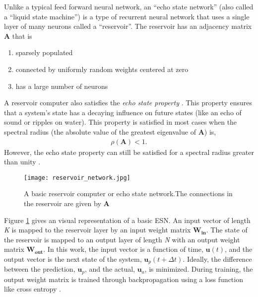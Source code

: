 Unlike a typical feed forward neural network, an ``echo state network'' (also
called a ``liquid state machine'') is a type of
recurrent neural network that uses a single layer of many neurons called a
``reservoir''. The reservoir has an adjacency matrix $\bm{A}$ that is
\begin{enumerate}
	\item sparsely populated
	\item connected by uniformly random weights centered at zero
	\item has a large number of neurons
\end{enumerate}
A reservoir computer also satisfies the \textit{echo state property}
\cite{pathak_model-free_2018, lukosevicius_reservoir_2009}. This
property ensures that a system's state has a decaying influence on future states
(like an echo of sound or ripples on water). This property is satisfied in most
cases when the spectral radius (the absolute value of the greatest eigenvalue of
$\bm{A}$)\cite{lukosevicius_reservoir_2009} is,
\begin{align}
	\rho(\bm{A}) < 1.
\end{align}
However, the echo state property can still be satisfied for a spectral radius
greater than unity \cite{lukosevicius_practical_2012}.

\begin{figure}[H]
	\texttt{[image: reservoir\_network.jpg]}
	\caption{A basic reservoir computer or echo state network.The connections in
	the reservoir are given by $\bm{A}$}
	\label{fig:RCmodel}
\end{figure}

Figure \ref{fig:RCmodel} gives an visual representation of a basic
\acrshort{ESN}. An
input vector of length \textit{K} is mapped to the reservoir layer by an input
weight matrix $\bm{W_{in}}$. The state of the reservoir is mapped to an output
layer of length \textit{N} with an output weight matrix $\bm{W_{out}}$. In this
work, the input vector is a function of time, $\bm{u}(t)$, and the output
vector is the next state of the system, $\bm{u}_p(t+\Delta t)$. Ideally, the
difference between the prediction, $\bm{u}_p$, and the actual, $\bm{u}_a$, is
minimized. During training, the output weight matrix is trained through
backpropagation using a loss function like cross entropy
\cite{pathak_model-free_2018, vlachas_backpropagation_2020}.

